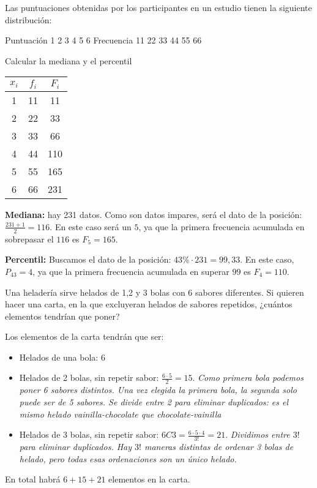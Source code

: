 \documentclass[palatino,nosec,nochap]{Docencia}
\begin{document}
\begin{problem}
Las puntuaciones obtenidas por los participantes en un estudio tienen la siguiente distribución:

Puntuación	1	2	3	4	5	6
Frecuencia	11	22	33	44	55	66

Calcular la mediana y el percentil

\solution

\begin{tabular}{ccc}
$x_i$ & $f_i$ & $F_i$\\\hline
1 & 11 & 11\\
2 & 22 & 33\\
3 & 33 & 66\\
4 & 44 & 110\\
5 & 55 & 165\\
6 & 66 & 231
\end{tabular}

\textbf{Mediana: } hay 231 datos. Como son datos impares, será el dato de la posición: $\frac{231+1}{2} = 116$. En este caso será un $5$, ya que la primera frecuencia acumulada en sobrepasar el $116$ es $F_5 = 165$.

\textbf{Percentil: } Buscamos el dato de la posición: $43\%·231 = 99,33$. En este caso, $P_{43} = 4$, ya que la primera frecuencia acumulada en superar $99$ es $F_4 = 110$.

\end{problem}

\begin{problem}
Una heladería sirve helados de 1,2 y 3 bolas con 6 sabores diferentes. Si quieren hacer una carta, en la que excluyeran helados de sabores repetidos, ¿cuántos elementos tendrían que poner?

\solution

Los elementos de la carta tendrán que ser:

\begin{itemize}
	\item Helados de una bola: $6$
	\item Helados de 2 bolas, sin repetir sabor: $\frac{6·5}{2} = 15$. \textit{Como primera bola podemos poner 6 sabores distintos. Una vez elegida la primera bola, la segunda solo puede ser de 5 sabores. Se divide entre 2 para eliminar duplicados: es el mismo helado vainilla-chocolate que chocolate-vainilla}
	\item Helados de 3 bolas, sin repetir sabor: $6C3 = \frac{6·5·4}{3!} = 21$. \textit{Dividimos entre $3!$ para eliminar duplicados. Hay $3!$ maneras distintas de ordenar 3 bolas de helado, pero todas esas ordenaciones son un único helado.}
\end{itemize}

En total habrá $6+15+21$ elementos en la carta.

\end{problem}
\end{document}
